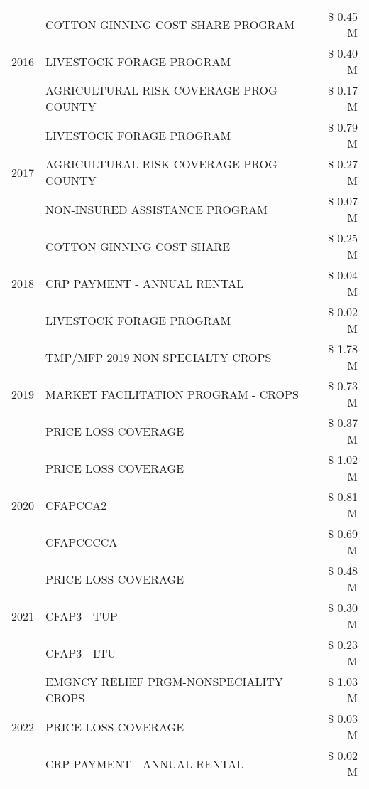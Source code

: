 \begin{tabular}{llr}
\cline{1-3}
\multirow[t]{3}{*}{2016} & COTTON GINNING COST SHARE PROGRAM & \$ 0.45 M \\
 & LIVESTOCK FORAGE PROGRAM & \$ 0.40 M \\
 & AGRICULTURAL RISK COVERAGE PROG - COUNTY & \$ 0.17 M \\
\cline{1-3}
\multirow[t]{3}{*}{2017} & LIVESTOCK FORAGE PROGRAM & \$ 0.79 M \\
 & AGRICULTURAL RISK COVERAGE PROG - COUNTY & \$ 0.27 M \\
 & NON-INSURED ASSISTANCE PROGRAM & \$ 0.07 M \\
\cline{1-3}
\multirow[t]{3}{*}{2018} & COTTON GINNING COST SHARE & \$ 0.25 M \\
 & CRP PAYMENT - ANNUAL RENTAL & \$ 0.04 M \\
 & LIVESTOCK FORAGE PROGRAM & \$ 0.02 M \\
\cline{1-3}
\multirow[t]{3}{*}{2019} & TMP/MFP 2019 NON SPECIALTY CROPS & \$ 1.78 M \\
 & MARKET FACILITATION PROGRAM - CROPS & \$ 0.73 M \\
 & PRICE LOSS COVERAGE & \$ 0.37 M \\
\cline{1-3}
\multirow[t]{3}{*}{2020} & PRICE LOSS COVERAGE & \$ 1.02 M \\
 & CFAPCCA2 & \$ 0.81 M \\
 & CFAPCCCCA & \$ 0.69 M \\
\cline{1-3}
\multirow[t]{3}{*}{2021} & PRICE LOSS COVERAGE & \$ 0.48 M \\
 & CFAP3 - TUP & \$ 0.30 M \\
 & CFAP3 - LTU & \$ 0.23 M \\
\cline{1-3}
\multirow[t]{3}{*}{2022} & EMGNCY RELIEF PRGM-NONSPECIALITY CROPS & \$ 1.03 M \\
 & PRICE LOSS COVERAGE & \$ 0.03 M \\
 & CRP PAYMENT - ANNUAL RENTAL & \$ 0.02 M \\
\cline{1-3}
\bottomrule
\end{tabular}
